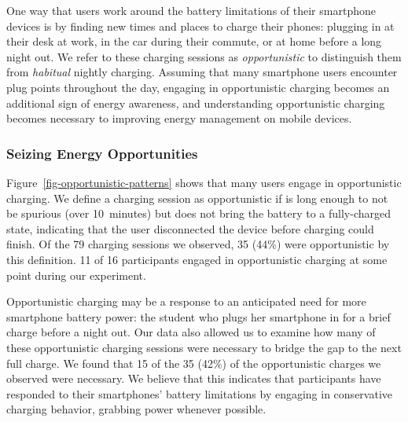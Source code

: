 One way that users work around the battery limitations of their smartphone
devices is by finding new times and places to charge their phones: plugging
in at their desk at work, in the car during their commute, or at home before
a long night out. We refer to these charging sessions as
\textit{opportunistic} to distinguish them from \textit{habitual} nightly
charging. Assuming that many smartphone users encounter plug points
throughout the day, engaging in opportunistic charging becomes an additional
sign of energy awareness, and understanding opportunistic charging becomes
necessary to improving energy management on mobile devices.

\subsubsection{Seizing Energy Opportunities}


Figure~\ref{fig-opportunistic-patterns} shows that many users engage in
opportunistic charging. We define a charging session as opportunistic if is
long enough to not be spurious (over 10~minutes) but does not bring the
battery to a fully-charged state, indicating that the user disconnected the
device before charging could finish. Of the 79 charging sessions we observed,
35 (44\%) were opportunistic by this definition. 11 of 16 participants
engaged in opportunistic charging at some point during our experiment.


Opportunistic charging may be a response to an anticipated need for more
smartphone battery power: the student who plugs her smartphone in for a brief
charge before a night out. Our data also allowed us to examine how many of
these opportunistic charging sessions were necessary to bridge the gap to the
next full charge. We found that 15 of the 35 (42\%) of the opportunistic
charges we observed were necessary. We believe that this indicates that
participants have responded to their smartphones' battery limitations by
engaging in conservative charging behavior, grabbing power whenever possible.

